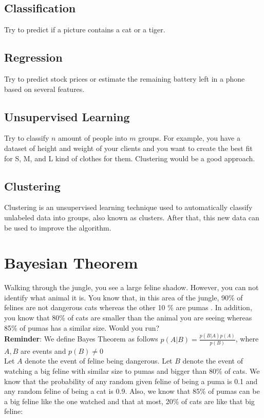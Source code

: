 \documentclass[]{article}
\begin{document}
\subsection{Classification}

Try to predict if a picture contains a cat or a tiger.

\subsection{Regression}

Try to predict stock prices or estimate the remaining battery left in a phone based on several features.

\subsection{Unsupervised Learning}

Try to classify $n$ amount of people into $m$ groups. For example, you have a dataset of height and weight of your clients and you want to create the best fit for S, M, and L kind of clothes for them. Clustering would be a good approach.

\subsection{Clustering}

Clustering is an unsupervised learning technique used to automatically classify unlabeled data into groups, also known as clusters. After that, this new data can be used to improve the algorithm.

\section{Bayesian Theorem}

Walking through the jungle, you see a large feline shadow. However, you can not identify what animal it is. You know that, in this area of the jungle, 90\% of felines are not dangerous cats whereas the other 10 \% are pumas . In addition, you know that 80\% of cats are smaller than the animal you are seeing whereas 85\% of pumas has a similar size. Would you run?\\

\textbf{Reminder}: We define Bayes Theorem as follows $p(A|B) = \frac{p(B|A)p(A)}{p(B)}$, where $A, B$ are events and $p(B) \neq 0$\\

Let $A$ denote the event of feline being dangerous. Let $B$ denote the event of watching a big feline with similar size to pumas and bigger than 80\% of cats. We know that the probability of any random given feline of being a puma is 0.1 and any random feline of being a cat is 0.9. Also, we know that 85\% of pumas can be a big feline like the one watched and that at most, 20\% of cats are like that big feline:\\
\end{document}
